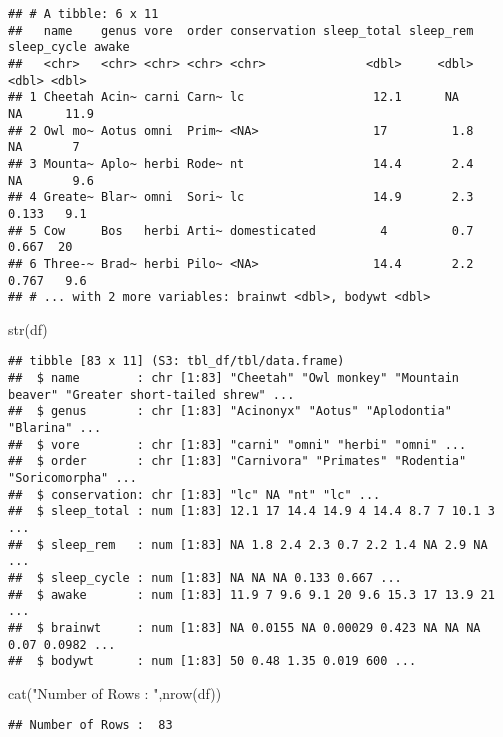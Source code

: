 \documentclass[
]{article}
\newenvironment{Shaded}{\begin{snugshade}}{\end{snugshade}}
\newcommand{\FunctionTok}[1]{\textcolor[rgb]{0.00,0.00,0.00}{#1}}
\newcommand{\NormalTok}[1]{#1}
\newcommand{\StringTok}[1]{\textcolor[rgb]{0.31,0.60,0.02}{#1}}
\begin{document}
\begin{verbatim}
## # A tibble: 6 x 11
##   name    genus vore  order conservation sleep_total sleep_rem sleep_cycle awake
##   <chr>   <chr> <chr> <chr> <chr>              <dbl>     <dbl>       <dbl> <dbl>
## 1 Cheetah Acin~ carni Carn~ lc                  12.1      NA        NA      11.9
## 2 Owl mo~ Aotus omni  Prim~ <NA>                17         1.8      NA       7  
## 3 Mounta~ Aplo~ herbi Rode~ nt                  14.4       2.4      NA       9.6
## 4 Greate~ Blar~ omni  Sori~ lc                  14.9       2.3       0.133   9.1
## 5 Cow     Bos   herbi Arti~ domesticated         4         0.7       0.667  20  
## 6 Three-~ Brad~ herbi Pilo~ <NA>                14.4       2.2       0.767   9.6
## # ... with 2 more variables: brainwt <dbl>, bodywt <dbl>
\end{verbatim}

\begin{Shaded}
\begin{Highlighting}[]
\FunctionTok{str}\NormalTok{(df)}
\end{Highlighting}
\end{Shaded}

\begin{verbatim}
## tibble [83 x 11] (S3: tbl_df/tbl/data.frame)
##  $ name        : chr [1:83] "Cheetah" "Owl monkey" "Mountain beaver" "Greater short-tailed shrew" ...
##  $ genus       : chr [1:83] "Acinonyx" "Aotus" "Aplodontia" "Blarina" ...
##  $ vore        : chr [1:83] "carni" "omni" "herbi" "omni" ...
##  $ order       : chr [1:83] "Carnivora" "Primates" "Rodentia" "Soricomorpha" ...
##  $ conservation: chr [1:83] "lc" NA "nt" "lc" ...
##  $ sleep_total : num [1:83] 12.1 17 14.4 14.9 4 14.4 8.7 7 10.1 3 ...
##  $ sleep_rem   : num [1:83] NA 1.8 2.4 2.3 0.7 2.2 1.4 NA 2.9 NA ...
##  $ sleep_cycle : num [1:83] NA NA NA 0.133 0.667 ...
##  $ awake       : num [1:83] 11.9 7 9.6 9.1 20 9.6 15.3 17 13.9 21 ...
##  $ brainwt     : num [1:83] NA 0.0155 NA 0.00029 0.423 NA NA NA 0.07 0.0982 ...
##  $ bodywt      : num [1:83] 50 0.48 1.35 0.019 600 ...
\end{verbatim}

\begin{Shaded}
\begin{Highlighting}[]
\FunctionTok{cat}\NormalTok{(}\StringTok{"Number of Rows : "}\NormalTok{,}\FunctionTok{nrow}\NormalTok{(df))}
\end{Highlighting}
\end{Shaded}

\begin{verbatim}
## Number of Rows :  83
\end{verbatim}
\end{document}
